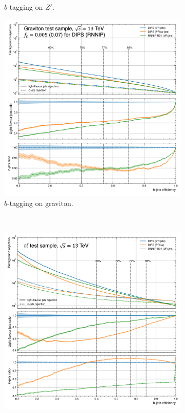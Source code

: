\begin{figure}
\begin{subfigure}[t]{0.32\textwidth}
    \caption{$b$-tagging on $Z'$.}
    \label{fig:dipsVRROCzp}
  \end{subfigure}
  \hfill
  \begin{subfigure}[t]{0.32\textwidth}
    \centering
    \includegraphics[width=\textwidth]{Images/FTAG/VRDips/ROC/grb.png}
    \caption{$b$-tagging on graviton.}
    \label{fig:dipsVRROCgr}
  \end{subfigure} \\
  \begin{subfigure}[t]{0.32\textwidth}
    \centering
    \includegraphics[width=\textwidth]{Images/FTAG/VRDips/ROC/ttc.png}

\end{subfigure}
\end{figure}
